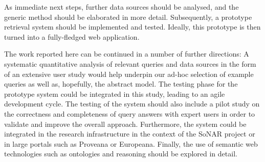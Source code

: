 As immediate next steps, further data sources should be analysed, and the generic method
should be elaborated in more detail. Subsequently, a prototype retrieval system should be implemented
and tested. Ideally, this prototype is then turned into a fully-fledged web application.

The work reported here can be continued in a number of further directions:
A systematic quantitative analysis of relevant queries and data sources
in the form of an extensive user study
would help underpin our ad-hoc selection of example queries
as well as, hopefully, the abstract model. 
The testing phase for the prototype system could be integrated in this study,
leading to an agile development cycle.
The testing of the system should also include a pilot study on the correctness and completeness of query answers
with expert users in order to validate and improve the overall approach.
Furthermore, the system could be integrated in the research infrastructure
in the context of the \gls{SoNAR} project or in large portals such as Proveana or Europeana.
Finally, the use of semantic web technologies such as ontologies and reasoning
should be explored in detail.

